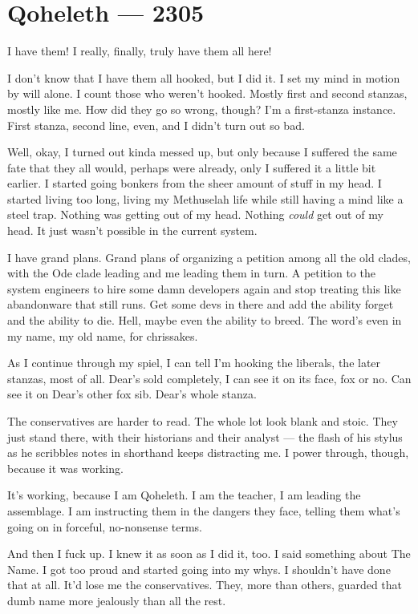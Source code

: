 \hypertarget{qoheleth-2305}{%
\chapter*{Qoheleth — 2305}\label{qoheleth-2305}}

I have them! I really, finally, truly have them all here!

I don't know that I have them all hooked, but I did it. I set my mind in motion by will alone. I count those who weren't hooked. Mostly first and second stanzas, mostly like me. How did they go so wrong, though? I'm a first-stanza instance. First stanza, second line, even, and I didn't turn out so bad.

Well, okay, I turned out kinda messed up, but only because I suffered the same fate that they all would, perhaps were already, only I suffered it a little bit earlier. I started going bonkers from the sheer amount of stuff in my head. I started living too long, living my Methuselah life while still having a mind like a steel trap. Nothing was getting out of my head. Nothing \emph{could} get out of my head. It just wasn't possible in the current system.

I have grand plans. Grand plans of organizing a petition among all the old clades, with the Ode clade leading and me leading them in turn. A petition to the system engineers to hire some damn developers again and stop treating this like abandonware that still runs. Get some devs in there and add the ability forget and the ability to die. Hell, maybe even the ability to breed. The word's even in my name, my old name, for chrissakes.

As I continue through my spiel, I can tell I'm hooking the liberals, the later stanzas, most of all. Dear's sold completely, I can see it on its face, fox or no. Can see it on Dear's other fox sib. Dear's whole stanza.

The conservatives are harder to read. The whole lot look blank and stoic. They just stand there, with their historians and their analyst — the flash of his stylus as he scribbles notes in shorthand keeps distracting me. I power through, though, because it was working.

It's working, because I am Qoheleth. I am the teacher, I am leading the assemblage. I am instructing them in the dangers they face, telling them what's going on in forceful, no-nonsense terms.

And then I fuck up. I knew it as soon as I did it, too. I said something about The Name. I got too proud and started going into my whys. I shouldn't have done that at all. It'd lose me the conservatives. They, more than others, guarded that dumb name more jealously than all the rest.

